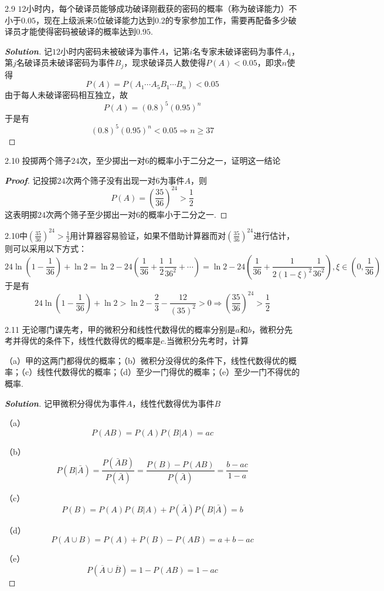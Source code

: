\documentclass[10pt, a4paper, oneside]{ctexart}
\newenvironment{solution}{\begin{proof}[\bf Solution]}{\end{proof}}
\newenvironment{myproof}{\begin{proof}[\bf Proof]}{\end{proof}}
\begin{document}
2.9 $12$小时内，每个破译员能够成功破译刚截获的密码的概率（称为破译能力）不小于$0.05$，现在上级派来$5$位破译能力达到$0.2$的专家参加工作，需要再配备多少破译员才能使得密码被破译的概率达到$0.95$.
\begin{solution}
记$12$小时内密码未被破译为事件$A$，记第$i$名专家未破译密码为事件$A_i$，第$j$名破译员未破译密码为事件$B_j$，现求破译员人数使得$P(A)<0.05$，即求$n$使得
\[P(A) = P({A_1} \cdots {A_5}{B_1} \cdots {B_n}) < 0.05\]
由于每人未破译密码相互独立，故
\[P(A) = {(0.8)^5}{(0.95)^n}\]
于是有
\[{(0.8)^5}{(0.95)^n} < 0.05 \Rightarrow n \geqslant 37\]
\end{solution}

2.10 投掷两个筛子$24$次，至少掷出一对$6$的概率小于二分之一，证明这一结论
\begin{myproof}
记投掷$24$次两个筛子没有出现一对$6$为事件$A$，则
\[P(A) = {\left( {\frac{{35}}{{36}}} \right)^{24}} > \frac{1}{2}\]
这表明掷$24$次两个筛子至少掷出一对$6$的概率小于二分之一.
\end{myproof}
\begin{remark}
2.10中${\left( {\frac{{35}}{{36}}} \right)^{24}} > \frac{1}{2}$用计算器容易验证，如果不借助计算器而对${\left( {\frac{{35}}{{36}}} \right)^{24}}$进行估计，则可以采用以下方式：
\[24\ln (1 - \frac{1}{{36}}) + \ln 2 = \ln 2 - 24(\frac{1}{{36}} + \frac{1}{2}\frac{1}{{{{36}^2}}} +  \cdots ) = \ln 2 - 24(\frac{1}{{36}} + \frac{1}{{2{{(1 - \xi )}^2}}}\frac{1}{{{{36}^2}}}),\xi  \in (0,\frac{1}{{36}})\]
于是有
\[24\ln (1 - \frac{1}{{36}}) + \ln 2 > \ln 2 - \frac{2}{3} - \frac{{12}}{{{{(35)}^2}}} > 0 \Rightarrow {\left( {\frac{{35}}{{36}}} \right)^{24}} > \frac{1}{2}\]
\end{remark}

2.11 无论哪门课先考，甲的微积分和线性代数得优的概率分别是$a$和$b$，微积分先考并得优的条件下，线性代数得优的概率是$c$.当微积分先考时，计算

（a）甲的这两门都得优的概率；（b）微积分没得优的条件下，线性代数得优的概率；（c）线性代数得优的概率；（d）至少一门得优的概率；（e）至少一门不得优的概率.
\begin{solution}
记甲微积分得优为事件$A$，线性代数得优为事件$B$

（a）
\[P(AB) = P(A)P(B|A) = ac\]

（b）\[P(B|\bar A) = \frac{{P(\bar AB)}}{{P(\bar A)}} = \frac{{P(B) - P(AB)}}{{P(\bar A)}} = \frac{{b - ac}}{{1 - a}}\]

（c）
\[P(B) = P(A)P(B|A) + P(\bar A)P(B|\bar A) = b\]

（d）
\[P(A \cup B) = P(A) + P(B) - P(AB) = a + b - ac\]

（e）
\[P(\overline A  \cup \overline B ) = 1 - P(AB) = 1 - ac\]
\end{solution}
\end{document}
